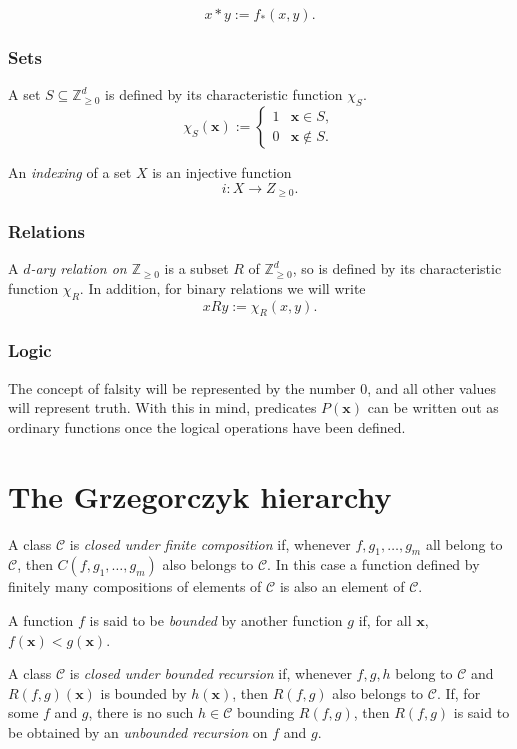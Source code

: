 \documentclass[a4paper]{article}
\newcommand{\Zpos}{\mathbb{Z}_{\geq 0}}
\newcommand{\xvec}{\mathbf{x}}	%
\newcommand{\classC}{$\mathcal{C}$}
\theoremstyle{plain}
\theoremstyle{definition}
\begin{document}
\[x \ast y := f_{\ast}(x,y). \]

\subsubsection{Sets}
A set $S \subseteq \Zpos^d$ is defined by its characteristic function $\chi_S$.
\[\chi_S(\xvec) := \begin{cases}
 1 & \xvec \in S, \\
 0 & \xvec \notin S.
 \end{cases}
\]

An {\it indexing} of a set $X$ is an injective function
\[ i : X \rightarrow Z_{\geq 0}. \]

\subsubsection{Relations}
A {\it $d$-ary relation on $\Zpos$} is
a subset $R$ of $\Zpos^d$, so is defined by its characteristic
function $\chi_R$. In addition, for binary relations we will write
\[ x R y := \chi_R(x,y). \]

\subsubsection{Logic}
The concept of falsity will be represented by the number $0$, and all other values will represent truth. With this in mind, predicates $P(\xvec)$ can be written out as ordinary functions once the logical operations have been defined.

\section{The Grzegorczyk hierarchy \label{grzegorczyk}}
A class \classC{}  is {\it closed under finite composition} if, whenever $f, g_1, \dots, g_m$ all belong to \classC{}, then $C(f,g_1, \dots, g_m)$ also belongs to \classC{}. In this case a function defined by finitely many compositions of elements of \classC{} is also an element of \classC{}.

A function $f$ is said to be {\it bounded} by another function $g$ if, for all $\xvec$, $f(\xvec) < g(\xvec)$.

A class \classC{} is {\it closed under bounded recursion} if, whenever $f,g,h$ belong to \classC{} and $R(f,g)(\xvec)$ is bounded by $h(\xvec)$, then $R(f,g)$ also belongs to \classC{}. If, for some $f$ and $g$, there is no such $h \in \mathcal{C}$ bounding $R(f,g)$, then $R(f,g)$ is said to be obtained by an {\it unbounded recursion} on $f$ and $g$.
\end{document}
